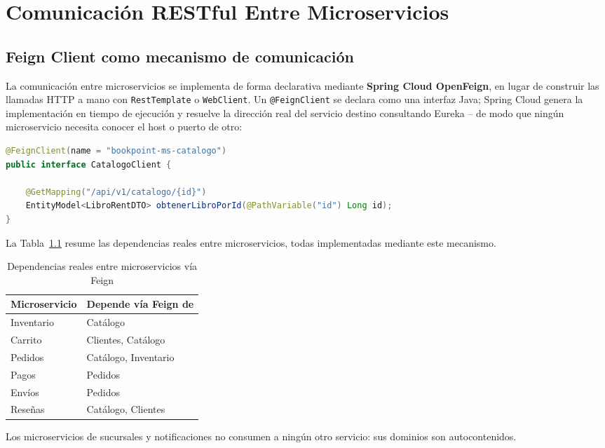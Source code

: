 \chapter{Comunicación RESTful Entre Microservicios}
\label{ch:rest}

\section{Feign Client como mecanismo de comunicación}

La comunicación entre microservicios se implementa de forma declarativa mediante
\textbf{Spring Cloud OpenFeign}, en lugar de construir las llamadas HTTP a mano con
\texttt{RestTemplate} o \texttt{WebClient}. Un \texttt{@FeignClient} se declara como una
interfaz Java; Spring Cloud genera la implementación en tiempo de ejecución y resuelve
la dirección real del servicio destino consultando Eureka -- de modo que ningún
microservicio necesita conocer el host o puerto de otro:

\begin{lstlisting}[language=Java, caption={CatalogoClient.java (inventario) -- Feign client}]
@FeignClient(name = "bookpoint-ms-catalogo")
public interface CatalogoClient {

    @GetMapping("/api/v1/catalogo/{id}")
    EntityModel<LibroRentDTO> obtenerLibroPorId(@PathVariable("id") Long id);
}
\end{lstlisting}

La Tabla~\ref{tab:dependencias-feign} resume las dependencias reales entre
microservicios, todas implementadas mediante este mecanismo.

\begin{table}[h]
\centering
\begin{tabular}{ll}
\toprule
\textbf{Microservicio} & \textbf{Depende vía Feign de} \\
\midrule
Inventario & Catálogo \\
Carrito & Clientes, Catálogo \\
Pedidos & Catálogo, Inventario \\
Pagos & Pedidos \\
Envíos & Pedidos \\
Reseñas & Catálogo, Clientes \\
\bottomrule
\end{tabular}
\caption{Dependencias reales entre microservicios vía Feign}
\label{tab:dependencias-feign}
\end{table}

Los microservicios de sucursales y notificaciones no consumen a ningún otro servicio:
sus dominios son autocontenidos.

